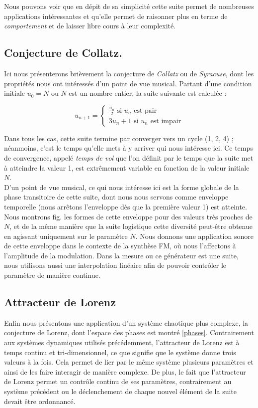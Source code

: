 \documentclass[12pt,a4paper]{article}
\begin{document}
Nous pouvons voir que en dépit de sa simplicité cette suite permet de nombreuses applications intéressantes et qu'elle permet de raisonner plus en terme de \textit{comportement} et de laisser libre cours à leur complexité. 

\subsection{Conjecture de Collatz.}
Ici nous présenterons brièvement la conjecture de \textit{Collatz} ou de \textit{Syracuse}, dont les propriétés nous ont intéressés d'un point de vue musical. Partant d'une condition initiale $u_0 = N$ ou $N$ est un nombre entier, la suite suivante est calculée : 

\[
u_{n+1} = \begin{cases} \frac{u_n}{2} \text{ si } u_n \text{ est pair} \\
3 u_n + 1  \text{ si } u_n \text{ est impair} \end{cases}
\]

Dans tous les cas, cette suite termine par converger vers un cycle (1, 2, 4) ; néanmoins, c'est le temps qu'elle mets à y arriver qui nous intéresse ici. Ce temps de convergence, appelé \textit{temps de vol} que l'on définit par le temps que la suite met à atteindre la valeur 1, est extrêmement variable en fonction de la valeur initiale $N$.\\

D'un point de vue musical, ce qui nous intéresse ici est la forme globale de la phase transitoire de cette suite, dont nous nous servons comme enveloppe temporelle (nous arrêtons l'enveloppe dès que la première valeur 1) est atteinte. Nous montrons fig. les formes de cette enveloppe pour des valeurs très proches de $N$, et de la même manière que la suite logistique cette diversité peut-être obtenue en agissant uniquement sur le paramètre $N$. Nous donnons une application sonore de cette enveloppe dans le contexte de la synthèse FM, où nous l'affectons à l'amplitude de la modulation. Dans la mesure ou ce générateur est une suite, nous utilisons  aussi une interpolation linéaire afin de pouvoir contrôler le paramètre de manière continue.


\subsection{Attracteur de Lorenz}
Enfin nous présentons une application d'un système chaotique plus complexe, la conjecture de Lorenz, dont l'espace des phases est montré \ref{phases}. Contrairement aux systèmes dynamiques utilisés précédemment, l'attracteur de Lorenz est à temps continu et tri-dimensionnel, ce que signifie que le système donne trois valeurs à la fois. Cela permet de lier par le même système plusieurs paramètres et ainsi de les faire interagir de manière complexe. De plus, le fait que l'attracteur de Lorenz permet un contrôle continu de ses paramètres, contrairement au système précédent ou le déclenchement de chaque nouvel élément de la suite devait être ordonnancé.\\
\end{document}
